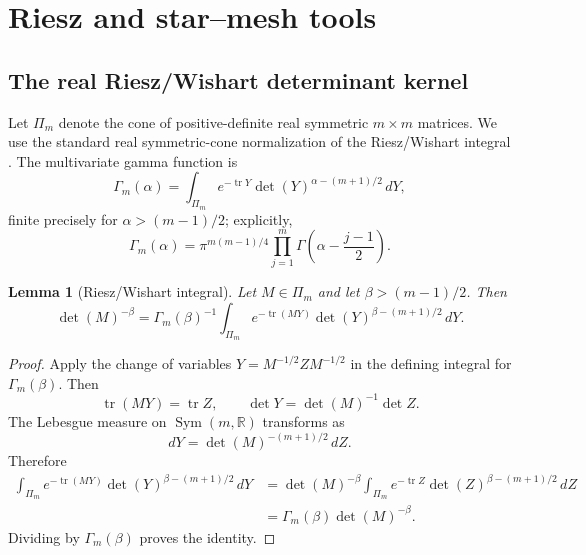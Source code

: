 \documentclass[preprint,12pt,authoryear]{elsarticle}
\numberwithin{equation}{section}
\newtheorem{lemma}[theorem]{Lemma}
\theoremstyle{definition}
\theoremstyle{remark}
\newcommand{\R}{\mathbb{R}}
\newcommand{\tr}{\operatorname{tr}}
\newcommand{\Sym}{\operatorname{Sym}}
\newcommand{\1}{\mathbf{1}}
\begin{document}
\section{Riesz and star--mesh tools}
\label{sec:riesz-star}

\subsection{The real Riesz/Wishart determinant kernel}

Let $\Pi_m$ denote the cone of positive-definite real symmetric $m\times m$ matrices.  We use the standard real symmetric-cone normalization of the Riesz/Wishart integral \cite{FarautKoranyi,Muirhead1982}.  The multivariate gamma function is
\begin{equation}
        \Gamma_m(\alpha)=\int_{\Pi_m} e^{-\tr Y}\det(Y)^{\alpha-(m+1)/2}\,dY,
\end{equation}
finite precisely for $\alpha>(m-1)/2$; explicitly,
\begin{equation}
        \Gamma_m(\alpha)=\pi^{m(m-1)/4}\prod_{j=1}^m \Gamma\left(\alpha-\frac{j-1}{2}\right).
\end{equation}

\begin{lemma}[Riesz/Wishart integral]
\label{lem:riesz}
Let $M\in\Pi_m$ and let $\beta>(m-1)/2$.  Then
\begin{equation}
        \det(M)^{-\beta}
        =\Gamma_m(\beta)^{-1}
          \int_{\Pi_m} e^{-\tr(MY)}\det(Y)^{\beta-(m+1)/2}\,dY .
\end{equation}
\end{lemma}

\begin{proof}
Apply the change of variables $Y=M^{-1/2}ZM^{-1/2}$ in the defining integral for $\Gamma_m(\beta)$.  Then
\begin{equation}
        \tr(MY)=\tr Z,
        \qquad
        \det Y=\det(M)^{-1}\det Z.
\end{equation}
The Lebesgue measure on $\Sym(m,\R)$ transforms as
\begin{equation}
        dY=\det(M)^{-(m+1)/2}\,dZ.
\end{equation}
Therefore
\begin{align}
\int_{\Pi_m} e^{-\tr(MY)}\det(Y)^{\beta-(m+1)/2}\,dY
&=\det(M)^{-\beta}\int_{\Pi_m} e^{-\tr Z}\det(Z)^{\beta-(m+1)/2}\,dZ  \\
&=\Gamma_m(\beta)\det(M)^{-\beta}.
\end{align}
Dividing by $\Gamma_m(\beta)$ proves the identity.
\end{proof}
\end{document}
